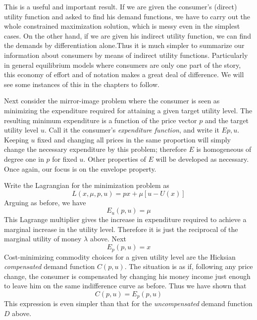 This is a useful and important result. If we are given the consumer's (direct) utility function and asked to find his demand functions, we have to carry out the whole constrained maximization solution, which is messy even in the simplest cases. On the other hand, if we are given his indirect utility function, we can find the demands by differentiation alone.Thus it is much simpler to summarize our information about consumers by means of indirect utility functions. Particularly in general equilibrium models where consumers are only one part of the story, this economy of effort and of notation makes a great deal of difference. We will see some instances of this in the chapters to follow.

Next consider the mirror-image problem where the consumer is seen as minimizing the expenditure required for attaining a given target utility level. The resulting minimum expenditure is a function of the price vector $p$ and the target utility level $u$. Call it the consumer's \textit{expenditure function}, and write it $E{p,u}$. Keeping $u$ fixed and changing all prices in the same proportion will simply change the necessary expenditure by this problem; therefore $E$ is homogeneous of degree one in $p$ for fixed $u$. Other properties of $E$ will be developed as necessary. Once again, our focus is on the envelope property.

Write the Lagrangian for the minimization problem as
\begin{equation*}
   L(x,\mu,p,u) = px + \mu[u-U(x)]
\end{equation*}
Arguing as before, we have
\begin{equation} \label{equa5.19}
   E_u(p, u) = \mu
\end{equation}
This Lagrange multiplier gives the increase in expenditure required to achieve a marginal increase in the utility level. Therefore it is just the reciprocal of the marginal utility of money $\lambda$ above. Next
\begin{equation*}
   E_p(p,u) = x
\end{equation*}
Cost-minimizing commodity choices for a given utility level are the Hicksian \textit{compensated} demand function $C(p,u)$. The situation is as if, following any price change, the consumer is compensated by changing his money income just enough to leave him on the same indifference curve as before. Thus we have shown that
\begin{equation} \label{equa5.20}
   C(p,u) = E_p(p,u)
\end{equation}
This expression is even simpler than that for the \textit{uncompensated} demand function $D$ above.

